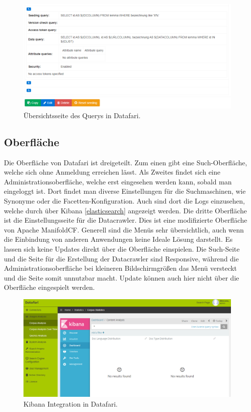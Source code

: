 \begin{figure}
	\centering
	\includegraphics[width=1\linewidth]{images/datafari_query.png}
	\caption{Übersichtsseite des Querys in Datafari.}
	\label{img:datafariQuery}
\end{figure}

\subsection{Oberfläche}

Die Oberfläche von Datafari ist dreigeteilt. Zum einen gibt eine Such-Oberfläche, welche sich ohne Anmeldung erreichen lässt. Als Zweites findet sich eine Administrationsoberfläche, welche erst eingesehen werden kann, sobald man eingeloggt ist. Dort findet man diverse Einstellungen für die Suchmaschinen, wie Synonyme oder die Facetten-Konfiguration. Auch sind dort die Logs einzusehen, welche durch über Kibana \ref{elasticsearch} angezeigt werden. Die dritte Oberfläche ist die Einstellungsseite für die Datacrawler. Dies ist eine modifizierte Oberfläche von Apache ManifoldCF. Generell sind die Menüs sehr übersichtlich, auch wenn die Einbindung von anderen Anwendungen keine Ideale Lösung darstellt. Es lassen sich keine Updates direkt über die Oberfläche einspielen.
Die Such-Seite und die Seite für die Erstellung der Datacrawler sind Responsive, während die Administrationsoberfläche bei kleineren Bildschirmgrößen das Menü versteckt und die Seite somit unnutzbar macht. Update können auch hier nicht über die Oberfläche eingespielt werden.

\begin{figure}
	\centering
	\includegraphics[width=1\linewidth]{images/datafari_kibana.png}
	\caption{Kibana Integration in Datafari.}
	\label{img:datafariKibana}
\end{figure}

